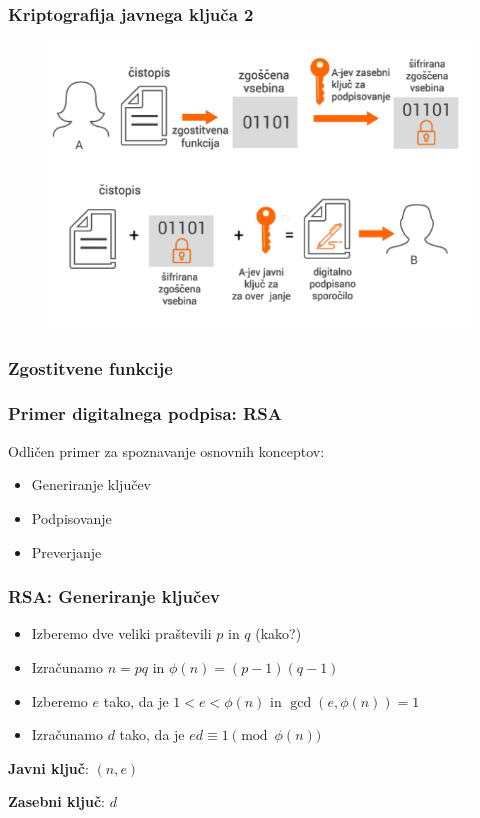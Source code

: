 \documentclass{beamer}    %
\begin{document}
\begin{frame}
    \frametitle{Kriptografija javnega ključa 2}
    \begin{figure}
        \includegraphics[width=\textwidth]{images/podpisovanje.png}
    \end{figure}
\end{frame}

\begin{frame}
    \frametitle{Zgostitvene funkcije}
\end{frame}

\begin{frame}
    \frametitle{Primer digitalnega podpisa: RSA}
    Odličen primer za spoznavanje osnovnih konceptov:
    \vspace{1cm}
    \begin{itemize}
        \item Generiranje ključev
        \item Podpisovanje
        \item Preverjanje 
    \end{itemize}
\end{frame}

\begin{frame}
    \frametitle{RSA: Generiranje ključev}
    \begin{itemize}
        \item Izberemo dve \alert{veliki} praštevili $p$ in $q$ (kako?)
        \item Izračunamo $n = pq$ in $\phi(n) = (p-1)(q-1)$
        \item Izberemo $e$ tako, da je $1 < e < \phi(n)$ in $\gcd(e, \phi(n)) = 1$
        \item Izračunamo $d$ tako, da je $ed \equiv 1 \pmod{\phi(n)}$
    \end{itemize}
    \begin{multicols*}{2}
        \textbf{Javni ključ}: $(n, e)$
        \columnbreak

        \textbf{Zasebni ključ}: $d$
    \end{multicols*}
\end{frame}
\end{document}
